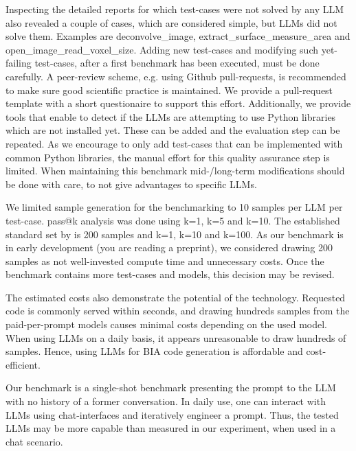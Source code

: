 \documentclass{ecai}
\begin{document}
Inspecting the detailed reports for which test-cases were not solved by any LLM also revealed a couple of cases, which are considered simple, but LLMs did not solve them. Examples are deconvolve\_image, extract\_surface\_measure\_area and open\_image\_read\_voxel\_size. Adding new test-cases and modifying such yet-failing test-cases, after a first benchmark has been executed, must be done carefully. A peer-review scheme, e.g. using Github pull-requests, is recommended to make sure good scientific practice is maintained. We provide a pull-request template with a short questionaire to support this effort. Additionally, we provide tools that enable to detect if the LLMs are attempting to use Python libraries which are not installed yet. These can be added and the evaluation step can be repeated. As we encourage to only add test-cases that can be implemented with common Python libraries, the manual effort for this quality assurance step is limited. When maintaining this benchmark mid-/long-term modifications should be done with care, to not give advantages to specific LLMs.

We limited sample generation for the benchmarking to 10 samples per LLM per test-case. pass@k analysis was done using k=1, k=5 and k=10. The established standard set by \citep{chen2021evaluating} is 200 samples and k=1, k=10 and k=100. As our benchmark is in early development (you are reading a preprint), we considered drawing 200 samples as not well-invested compute time and unnecessary costs. Once the benchmark contains more test-cases and models, this decision may be revised. 

The estimated costs also demonstrate the potential of the technology. Requested code is commonly served within seconds, and drawing hundreds samples from the paid-per-prompt models causes minimal costs depending on the used model. When using LLMs on a daily basis, it appears unreasonable to draw hundreds of samples. Hence, using LLMs for BIA code generation is affordable and cost-efficient.

Our benchmark is a single-shot benchmark presenting the prompt to the LLM with no history of a former conversation. In daily use, one can interact with LLMs using chat-interfaces and iteratively engineer a prompt. Thus, the tested LLMs may be more capable than measured in our experiment, when used in a chat scenario.
\end{document}
